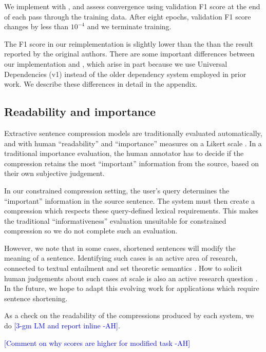 \documentclass[11pt,a4paper]{article}
\newcommand{\ahcomment}[1]{\textcolor{blue}{[#1 -AH]}}
\begin{document}
We implement with \citet{gurobi}, and assess convergence using validation F1 score at the end of each pass through the training data. After eight epochs, validation F1 score changes by less than $10^{-4}$ and we terminate training. 

The F1 score in our reimplementation is slightly lower than the than the result reported by the original authors. There are some important differences between our implementation and \citet{filippova2013overcoming}, which arise in part because we use Universal Dependencies (v1) instead of the older dependency system employed in prior work. We describe these differences in detail in the appendix.

\subsection{Readability and importance}\label{s:readabilityinformativeness}

Extractive sentence compression models are traditionally evaluated automatically, and with human ``readability'' and ``importance'' measures on a Likert scale \cite{Knight2000StatisticsBasedS,filippova2015sentence}. In a traditional importance evaluation, the human annotator has to decide if the compression retains the most ``important'' information from the source, based on their own subjective judgement. 

In our constrained compression setting, the user's query determines the ``important'' information in the source sentence. The system must then create a compression which respects these query-defined lexical requirements. This makes the traditional ``informativeness'' evaluation unsuitable for constrained compression so we do not complete such an evaluation. 

However, we note that in some cases, shortened sentences will modify the meaning of a sentence. Identifying such cases is an active area of research, connected to textual entailment and set theoretic semantics \cite{Nayak2014ADO,Pavlick2016SoCalledNA,linzencompression}. How to solicit human judgements about such cases at scale is also an active research question \cite{snli_bowman,annotation_artifacts_snli}. In the future, we hope to adapt this evolving work for applications which require sentence shortening.  
 
As a check on the readability of the compressions produced by each system, we do \ahcomment{3-gm LM and report inline}.

\ahcomment{Comment on why scores are higher for modified task}
\end{document}
